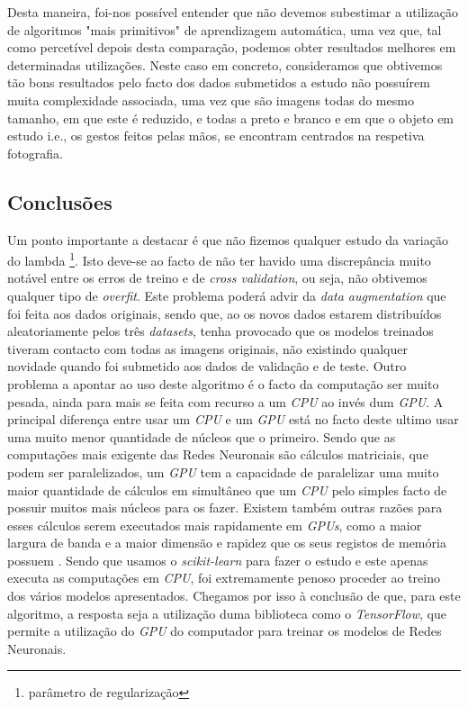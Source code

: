 Desta maneira, foi-nos possível entender que não devemos subestimar a utilização de algoritmos "mais primitivos" de aprendizagem automática, uma vez que, tal como percetível depois desta comparação, podemos obter resultados melhores em determinadas utilizações. Neste caso em concreto, consideramos que obtivemos tão bons resultados pelo facto dos dados submetidos a estudo não possuírem muita complexidade associada, uma vez que são imagens todas do mesmo tamanho, em que este é reduzido, e todas a preto e branco e em que o objeto em estudo i.e., os gestos feitos pelas mãos, se encontram centrados na respetiva fotografia. 


\subsection{Conclusões}
Um ponto importante a destacar é que não fizemos qualquer estudo da variação do lambda \footnote{parâmetro de regularização}. Isto deve-se ao facto de não ter havido uma discrepância muito notável entre os erros de treino e de \textit{cross validation}, ou seja, não obtivemos qualquer tipo de \textit{overfit}. Este problema poderá advir da \textit{data augmentation} que foi feita aos dados originais, sendo que, ao os novos dados estarem distribuídos aleatoriamente pelos três \textit{datasets}, tenha provocado que os modelos treinados tiveram contacto com todas as imagens originais, não existindo qualquer novidade quando foi submetido aos dados de validação e de teste.
Outro problema a apontar ao uso deste algoritmo é o facto da computação ser muito pesada, ainda para mais se feita com recurso a um \textit{CPU} ao invés dum \textit{GPU}. A principal diferença entre usar um \textit{CPU} e um \textit{GPU} está no facto deste ultimo usar   uma muito menor quantidade de núcleos que o primeiro. Sendo que as computações mais exigente das Redes Neuronais são cálculos matriciais, que podem ser paralelizados, um \textit{GPU} tem a capacidade de paralelizar uma muito maior quantidade de cálculos em simultâneo que um \textit{CPU} pelo simples facto de possuir muitos mais núcleos para os fazer. Existem também outras razões para esses cálculos serem executados mais rapidamente em \textit{GPUs}, como a maior largura de banda e a maior dimensão e rapidez que os seus registos de memória possuem \cite{cpu_vs_gpu}. Sendo que usamos o \textit{scikit-learn} para fazer o estudo e este apenas executa as computações em \textit{CPU}, foi extremamente penoso proceder ao treino dos vários modelos apresentados. Chegamos por isso à conclusão de que, para este algoritmo, a resposta seja a utilização duma biblioteca como o \textit{TensorFlow}, que permite a utilização do \textit{GPU} do computador para treinar os modelos de Redes Neuronais.
